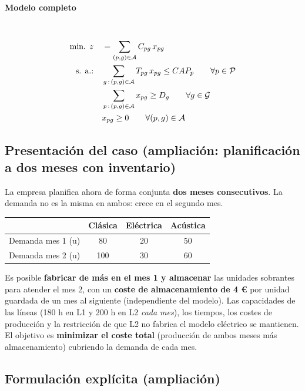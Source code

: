 \paragraph{Modelo completo}\mbox{}\\
\begin{align}
\mbox{min. } z \quad & = \sum_{(p,g)\in\mathcal{A}} C_{pg}\, x_{pg} \notag \\
\mbox{s. a.:} \quad
& \sum_{g\,:\,(p,g)\in\mathcal{A}} T_{pg}\, x_{pg} \leq CAP_p \qquad \forall p \in \mathcal{P} \notag \\
& \sum_{p\,:\,(p,g)\in\mathcal{A}} x_{pg} \geq D_g \qquad \forall g \in \mathcal{G} \notag \\
& x_{pg} \geq 0 \qquad \forall (p,g)\in\mathcal{A} \notag
\end{align}


\subsection{Presentación del caso (ampliación: planificación a dos meses con inventario)}

La empresa planifica ahora de forma conjunta \textbf{dos meses consecutivos}. La demanda no es la misma en ambos: crece en el segundo mes.

\begin{center}
\begin{tabular}{lccc}
\toprule
 & \textbf{Clásica} & \textbf{Eléctrica} & \textbf{Acústica}\\
\midrule
Demanda mes 1 (u) & 80 & 20 & 50\\
Demanda mes 2 (u) & 100 & 30 & 60\\
\bottomrule
\end{tabular}
\end{center}

Es posible \textbf{fabricar de más en el mes 1 y almacenar} las unidades sobrantes para atender el mes 2, con un \textbf{coste de almacenamiento de 4 €} por unidad guardada de un mes al siguiente (independiente del modelo). Las capacidades de las líneas (180 h en L1 y 200 h en L2 \emph{cada mes}), los tiempos, los costes de producción y la restricción de que L2 no fabrica el modelo eléctrico se mantienen. El objetivo es \textbf{minimizar el coste total} (producción de ambos meses más almacenamiento) cubriendo la demanda de cada mes.

\subsection{Formulación explícita (ampliación)}

